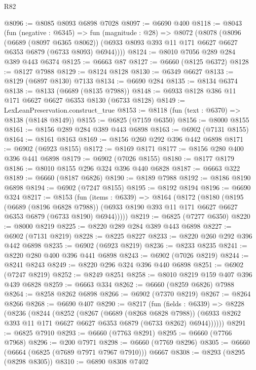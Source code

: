 \begin{lexlean}{R82}
\begin{coremodule}
@8096 := @8085 @8093 @6898 @7028
@8097 := @6690 @400
@8118 := @8043
    (fun (negative : @6345) =>
    fun (magnitude : @28) =>
    @8072
      (@8078
        (@8096
          (@6689 (@8097 @6365 @8062))
          (@6933 @8093 @393 @11 @171 @6627 @6627 @6353 @6879 (@6733 @8093) @6944))))
@8124 := @8010 @7056 @289 @284 @389 @443 @6374
@8125 := @6663 @87
@8127 := @6660 (@8125 @6372)
@8128 := @8127 @7988
@8129 := @8124 @8128
@8130 := @6349 @6627
@8133 := @8129 (@6897 @8130) @7133
@8134 := @6690 @284
@8135 := @8134 @6374
@8138 := @8133 (@6689 (@8135 @7988))
@8148 := @6933 @8128 @386 @11 @171 @6627 @6627 @6353 @8130 (@6733 @8128)
@8149 := LexLeanPreservation.construct_true
@8153 := @8118 (fun (text : @6370) => @8138 (@8148 @8149))
@8155 := @6825 (@7159 @6350)
@8156 := @8000 @8155
@8161 := @8156 @289 @284 @389 @443 @6898
@8163 := @6902 (@7131 @8155)
@8164 := @8161 @8163
@8169 := @8156 @260 @292 @396 @442 @6898
@8171 := @6902 (@6923 @8155)
@8172 := @8169 @8171
@8177 := @8156 @280 @400 @396 @441 @6898
@8179 := @6902 (@7026 @8155)
@8180 := @8177 @8179
@8186 := @8010 @8155 @296 @324 @396 @440 @6828
@8187 := @6663 @322
@8189 := @6660 (@8187 @6826)
@8190 := @8189 @7988
@8192 := @8186 @8190 @6898
@8194 := @6902 (@7247 @8155)
@8195 := @8192 @8194
@8196 := @6690 @324
@8217 := @8153
    (fun (items : @6339) =>
    @8164
      (@8172
        (@8180
          (@8195
            (@6689 (@8196 @6828 @7988))
            (@6933 @8190 @393 @11 @171 @6627 @6627 @6353 @6879 (@6733 @8190) @6944)))))
@8219 := @6825 (@7277 @6350)
@8220 := @8000 @8219
@8225 := @8220 @289 @284 @389 @443 @6898
@8227 := @6902 (@7131 @8219)
@8228 := @8225 @8227
@8233 := @8220 @260 @292 @396 @442 @6898
@8235 := @6902 (@6923 @8219)
@8236 := @8233 @8235
@8241 := @8220 @280 @400 @396 @441 @6898
@8243 := @6902 (@7026 @8219)
@8244 := @8241 @8243
@8249 := @8220 @296 @324 @396 @440 @6898
@8251 := @6902 (@7247 @8219)
@8252 := @8249 @8251
@8258 := @8010 @8219 @159 @407 @396 @439 @6828
@8259 := @6663 @334
@8262 := @6660 (@8259 @6826) @7988
@8264 := @8258 @8262 @6898
@8266 := @6902 (@7370 @8219)
@8267 := @8264 @8266
@8268 := @6690 @407
@8290 := @8217
    (fun (fields : @6339) =>
    @8228
      (@8236
        (@8244
          (@8252
            (@8267
              (@6689 (@8268 @6828 @7988))
              (@6933 @8262 @393 @11 @171 @6627 @6627 @6353 @6879 (@6733 @8262) @6944))))))
@8291 := @6825 @7910
@8293 := @6660 (@7763 @8291)
@8295 := @6660 (@7766 @7968)
@8296 := @200 @7971
@8298 := @6660 (@7769 @8296)
@8305 := @6660 (@6664 (@6825 (@7689 @7971 @7967 @7910))) @6667
@8308 := @8293 (@8295 (@8298 @8305))
@8310 := @6890 @8308 @7402

\end{coremodule}
\end{lexlean}
